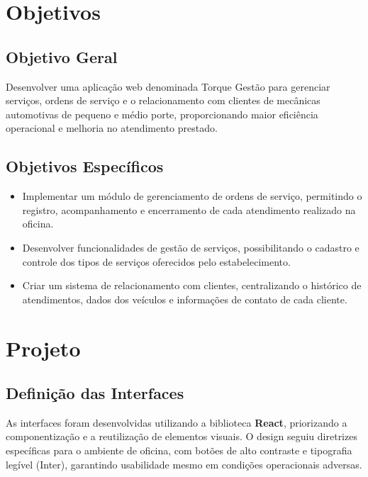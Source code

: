 \documentclass[12pt, a4paper]{article}
\begin{document}
\section{Objetivos}

\subsection{Objetivo Geral}

Desenvolver uma aplicação web denominada Torque Gestão para gerenciar serviços, ordens de serviço e o relacionamento com clientes de mecânicas automotivas de pequeno e médio porte, proporcionando maior eficiência operacional e melhoria no atendimento prestado.

\subsection{Objetivos Específicos}

\begin{itemize}
    \item Implementar um módulo de gerenciamento de ordens de serviço, permitindo o registro, acompanhamento e encerramento de cada atendimento realizado na oficina.
    \item Desenvolver funcionalidades de gestão de serviços, possibilitando o cadastro e controle dos tipos de serviços oferecidos pelo estabelecimento.
    \item Criar um sistema de relacionamento com clientes, centralizando o histórico de atendimentos, dados dos veículos e informações de contato de cada cliente.
\end{itemize}

\section{Projeto}

\subsection{Definição das Interfaces}

As interfaces foram desenvolvidas utilizando a biblioteca \textbf{React}, priorizando a componentização e a reutilização de elementos visuais. O design seguiu diretrizes específicas para o ambiente de oficina, com botões de alto contraste e tipografia legível (Inter), garantindo usabilidade mesmo em condições operacionais adversas.
\end{document}
